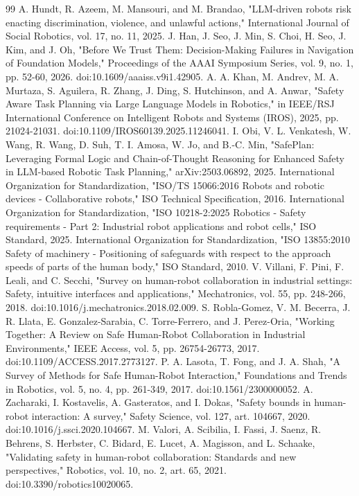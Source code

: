 \documentclass{ieeeaccess}
\begin{document}
\begin{thebibliography}{99}
 A. Hundt, R. Azeem, M. Mansouri, and M. Brandao, "LLM-driven robots risk enacting discrimination, violence, and unlawful actions," International Journal of Social Robotics, vol. 17, no. 11, 2025.
 J. Han, J. Seo, J. Min, S. Choi, H. Seo, J. Kim, and J. Oh, "Before We Trust Them: Decision-Making Failures in Navigation of Foundation Models," Proceedings of the AAAI Symposium Series, vol. 9, no. 1, pp. 52-60, 2026. doi:10.1609/aaaiss.v9i1.42905.
 A. A. Khan, M. Andrev, M. A. Murtaza, S. Aguilera, R. Zhang, J. Ding, S. Hutchinson, and A. Anwar, "Safety Aware Task Planning via Large Language Models in Robotics," in IEEE/RSJ International Conference on Intelligent Robots and Systems (IROS), 2025, pp. 21024-21031. doi:10.1109/IROS60139.2025.11246041.
 I. Obi, V. L. Venkatesh, W. Wang, R. Wang, D. Suh, T. I. Amosa, W. Jo, and B.-C. Min, "SafePlan: Leveraging Formal Logic and Chain-of-Thought Reasoning for Enhanced Safety in LLM-based Robotic Task Planning," arXiv:2503.06892, 2025.
 International Organization for Standardization, "ISO/TS 15066:2016 Robots and robotic devices - Collaborative robots," ISO Technical Specification, 2016.
 International Organization for Standardization, "ISO 10218-2:2025 Robotics - Safety requirements - Part 2: Industrial robot applications and robot cells," ISO Standard, 2025.
 International Organization for Standardization, "ISO 13855:2010 Safety of machinery - Positioning of safeguards with respect to the approach speeds of parts of the human body," ISO Standard, 2010.
 V. Villani, F. Pini, F. Leali, and C. Secchi, "Survey on human-robot collaboration in industrial settings: Safety, intuitive interfaces and applications," Mechatronics, vol. 55, pp. 248-266, 2018. doi:10.1016/j.mechatronics.2018.02.009.
 S. Robla-Gomez, V. M. Becerra, J. R. Llata, E. Gonzalez-Sarabia, C. Torre-Ferrero, and J. Perez-Oria, "Working Together: A Review on Safe Human-Robot Collaboration in Industrial Environments," IEEE Access, vol. 5, pp. 26754-26773, 2017. doi:10.1109/ACCESS.2017.2773127.
 P. A. Lasota, T. Fong, and J. A. Shah, "A Survey of Methods for Safe Human-Robot Interaction," Foundations and Trends in Robotics, vol. 5, no. 4, pp. 261-349, 2017. doi:10.1561/2300000052.
 A. Zacharaki, I. Kostavelis, A. Gasteratos, and I. Dokas, "Safety bounds in human-robot interaction: A survey," Safety Science, vol. 127, art. 104667, 2020. doi:10.1016/j.ssci.2020.104667.
 M. Valori, A. Scibilia, I. Fassi, J. Saenz, R. Behrens, S. Herbster, C. Bidard, E. Lucet, A. Magisson, and L. Schaake, "Validating safety in human-robot collaboration: Standards and new perspectives," Robotics, vol. 10, no. 2, art. 65, 2021. doi:10.3390/robotics10020065.

\end{thebibliography}
\end{document}
